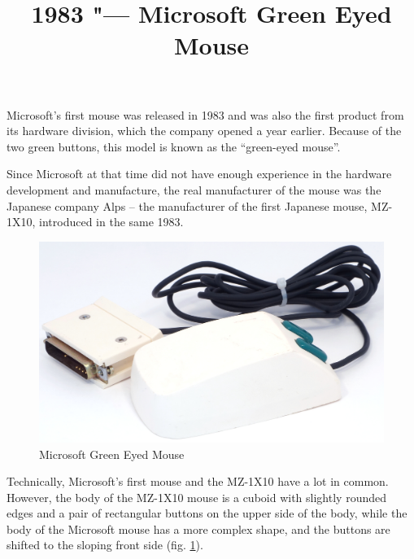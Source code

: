 \documentclass[11pt, a4paper]{article}
\begin{document}
\title{1983 "--- Microsoft Green Eyed Mouse}
\date{}
\maketitle
{}

Microsoft's first mouse was released in 1983 and was also the first product from its hardware division, which the company opened a year earlier. Because of the two green buttons, this model is known as the ``green-eyed mouse''.

Since Microsoft at that time did not have enough experience in the hardware development and manufacture, the real manufacturer of the mouse was the Japanese company Alps -- the manufacturer of the first Japanese mouse, MZ-1X10, introduced in the same 1983.

\begin{figure}[h]
   \centering
    \includegraphics[scale=0.6]{1983_microsoft_green_eyed_mouse/pic_30.jpg}
    \caption{Microsoft Green Eyed Mouse}
    \label{fig:MicrosoftGreenEyedPic}
\end{figure}

Technically, Microsoft's first mouse and the MZ-1X10 have a lot in common. However, the body of the MZ-1X10 mouse is a cuboid with slightly rounded edges and a pair of rectangular buttons on the upper side of the body, while the body of the Microsoft mouse has a more complex shape, and the buttons are shifted to the sloping front side (fig.  \ref{fig:MicrosoftGreenEyedPic}).
\end{document}
